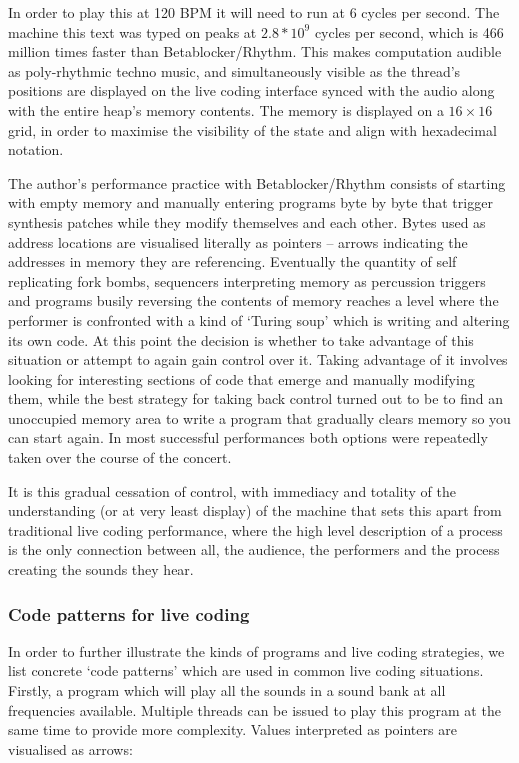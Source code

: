 \documentclass[letterpaper, 12pt]{article}
\begin{document}
In order to play this at 120 BPM it will need to run at 6 cycles per second. The machine this text was typed on peaks at $2.8*10^9$ cycles per second, which is 466 million times faster than Betablocker/Rhythm.
This makes computation audible as poly-rhythmic techno music, and simultaneously visible as the thread's positions are displayed on the live coding interface synced with the audio along with the entire heap's memory contents. The memory is displayed on a $16\times16$ grid, in order to maximise the visibility of the state and align with hexadecimal notation.

The author's performance practice with Betablocker/Rhythm consists of starting with empty memory and manually entering programs byte by byte that trigger synthesis patches while they modify themselves and each other.
Bytes used as address locations are visualised literally as pointers -- arrows indicating the addresses in memory they are referencing.
Eventually the quantity of self replicating fork bombs, sequencers interpreting memory as percussion triggers and programs busily reversing the contents of memory reaches a level where the performer is confronted with a kind of `Turing soup' which is writing and altering its own code.
At this point the decision is whether to take advantage of this situation or attempt to again gain control over it.
Taking advantage of it involves looking for interesting sections of code that emerge and manually modifying them, while the best strategy for taking back control turned out to be to find an unoccupied memory area to write a program that gradually clears memory so you can start again.
In most successful performances both options were repeatedly taken over the course of the concert.

It is this gradual cessation of control, with immediacy and totality of the understanding (or at very least display) of the machine that sets this apart from traditional live coding performance, where the high level description of a process is the only connection between all, the audience, the performers and the process creating the sounds they hear.
\parskip 18pt

\subsubsection{Code patterns for live coding}
\label{ssub:code_patterns_for_livecoding}

In order to further illustrate the kinds of programs and live coding strategies, we list concrete `code patterns' which are used in common live coding situations.
Firstly, a program which will play all the sounds in a sound bank at all frequencies available.
Multiple threads can be issued to play this program at the same time to provide more complexity.
Values interpreted as pointers are visualised as arrows:
\end{document}
